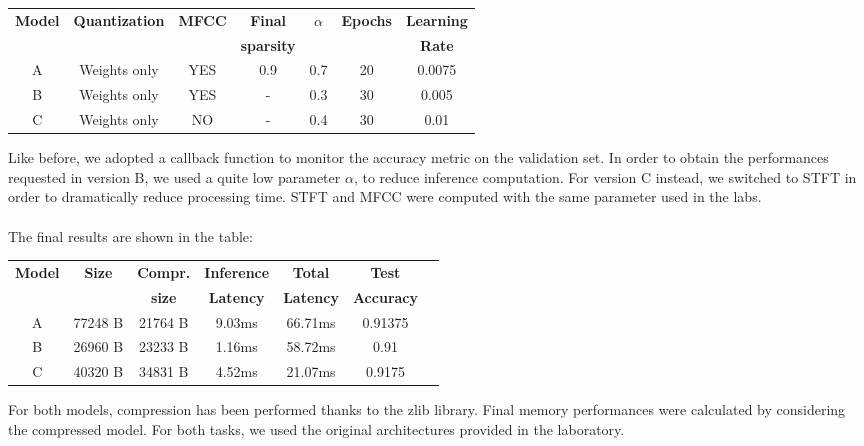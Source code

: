 \documentclass{article}
\begin{document}
\begin{center}
\begin{tabular}{|c|c|c|c|c|c|c|}
\hline
\vspace{-0.1cm}

\textbf{Model} &\textbf{Quantization} &\textbf{MFCC} &\textbf{Final} & \textbf{$\alpha$} &\textbf{Epochs} &\textbf{Learning} \\

&&&\textbf{sparsity}&&&\textbf{Rate} \\
\hline
A & Weights only & YES &0.9 & 0.7  & 20  & 0.0075\\
B& Weights only & YES &- &  0.3   & 30 & 0.005\\ 
C & Weights only & NO &- &  0.4   & 30 & 0.01\\ 

\hline
\end{tabular}
\end{center}
Like before, we adopted a callback function to monitor the accuracy metric on the validation set.
In order to obtain the performances requested in version B, we used a quite low parameter $\alpha$, to reduce inference computation. For version C instead, we switched to STFT in order to dramatically reduce processing time.
STFT and MFCC were computed with the same parameter used in the labs.
\\\\
The final results are shown in the table:
\begin{center}
\begin{tabular}{|c|c|c|c|c|c|c|}
\hline
\vspace{-0.1cm}

\textbf{Model} &\textbf{Size} &\textbf{Compr.}&  \textbf{Inference }& \textbf{Total}  &\textbf{Test} \\
&&\textbf{size}&\textbf{Latency}&\textbf{Latency}&\textbf{Accuracy}\\
\hline
A  & 77248 B & 21764 B & 9.03ms&   66.71ms  & 0.91375 \\ 
B  & 26960 B & 23233 B  &  1.16ms& 58.72ms & 0.91 \\ 
C  & 40320 B & 34831 B  & 4.52ms & 21.07ms  & 0.9175 \\ 

\hline
\end{tabular}
\end{center}

For both models, compression has been performed thanks to the zlib library. Final memory performances were calculated by considering the compressed model.
For both tasks, we used the original architectures provided in the laboratory.
\end{document}
